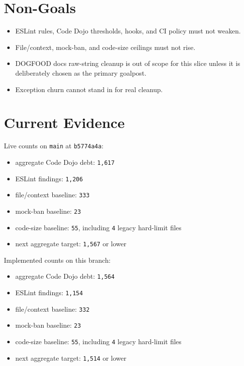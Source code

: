 \section{Non-Goals}\label{record-225-non-goals}

\begin{itemize}
\tightlist
\item
  ESLint rules, Code Dojo thresholds, hooks, and CI policy must not weaken.
\item
  File/context, mock-ban, and code-size ceilings must not rise.
\item
  DOGFOOD docs raw-string cleanup is out of scope for this slice unless it is deliberately chosen as the primary goalpost.
\item
  Exception churn cannot stand in for real cleanup.
\end{itemize}

\section{Current Evidence}\label{record-225-current-evidence}

Live counts on \texttt{m\allowbreak{}a\allowbreak{}i\allowbreak{}n} at \texttt{b\allowbreak{}5\allowbreak{}7\allowbreak{}7\allowbreak{}4\allowbreak{}a\allowbreak{}4\allowbreak{}a}:

\begin{itemize}
\tightlist
\item
  aggregate Code Dojo debt: \texttt{1\allowbreak{},\allowbreak{}6\allowbreak{}1\allowbreak{}7}
\item
  ESLint findings: \texttt{1\allowbreak{},\allowbreak{}2\allowbreak{}0\allowbreak{}6}
\item
  file/context baseline: \texttt{3\allowbreak{}3\allowbreak{}3}
\item
  mock-ban baseline: \texttt{2\allowbreak{}3}
\item
  code-size baseline: \texttt{5\allowbreak{}5}, including \texttt{4} legacy hard-limit files
\item
  next aggregate target: \texttt{1\allowbreak{},\allowbreak{}5\allowbreak{}6\allowbreak{}7} or lower
\end{itemize}

Implemented counts on this branch:

\begin{itemize}
\tightlist
\item
  aggregate Code Dojo debt: \texttt{1\allowbreak{},\allowbreak{}5\allowbreak{}6\allowbreak{}4}
\item
  ESLint findings: \texttt{1\allowbreak{},\allowbreak{}1\allowbreak{}5\allowbreak{}4}
\item
  file/context baseline: \texttt{3\allowbreak{}3\allowbreak{}2}
\item
  mock-ban baseline: \texttt{2\allowbreak{}3}
\item
  code-size baseline: \texttt{5\allowbreak{}5}, including \texttt{4} legacy hard-limit files
\item
  next aggregate target: \texttt{1\allowbreak{},\allowbreak{}5\allowbreak{}1\allowbreak{}4} or lower
\end{itemize}

